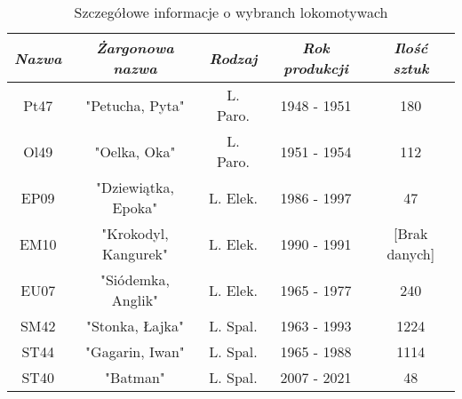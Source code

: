 \begin{center}
\begin{table}[!ht]
\caption{Szczegółowe informacje o wybranch lokomotywach}
\label{tab:Tabela}
\begin{tabular}{@{}|c|c|c|c|c|@{}}
\toprule
\textit{\textbf{Nazwa}} & \textit{\textbf{Żargonowa nazwa}} & \textit{\textbf{Rodzaj}} & \textit{\textbf{Rok produkcji}} & \textit{\textbf{Ilość sztuk}} \\ \midrule
Pt47                         & "Petucha, Pyta"                              & L. Paro.              & 1948 - 1951                     & 180                                    \\ \midrule
Ol49                         & "Oelka, Oka"                                 & L. Paro.              & 1951 - 1954                     & 112                                    \\ \midrule
EP09                         & "Dziewiątka, Epoka"                          & L. Elek.        & 1986 - 1997                     & 47                                     \\ \midrule
EM10                         & "Krokodyl, Kangurek"                         & L. Elek.        & 1990 - 1991                     & {[}Brak danych{]}                    \\ \midrule
EU07                         & "Siódemka, Anglik"                           & L. Elek.        & 1965 - 1977                     & 240                                    \\ \midrule
SM42                         & "Stonka, Łajka"                              & L. Spal.          & 1963 - 1993                     & 1224                                   \\ \midrule
ST44                         & "Gagarin, Iwan"                              & L. Spal.          & 1965 - 1988                     & 1114                                   \\ \midrule
ST40                         & "Batman"                                     & L. Spal.           & 2007 - 2021                     & 48                                     \\ \bottomrule
\end{tabular}
\end{table}
\end{center}